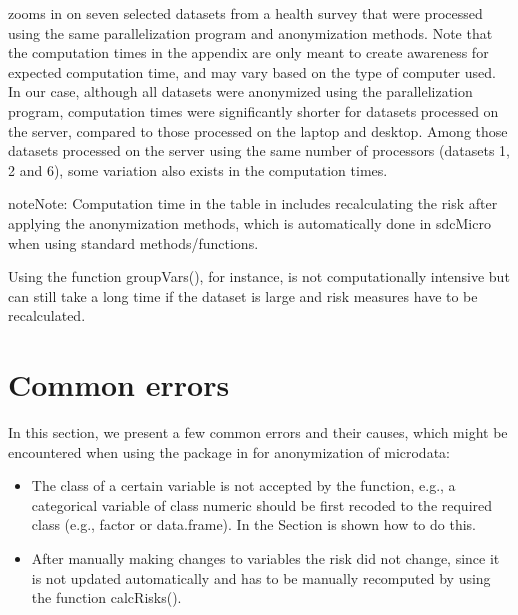\documentclass[letterpaper,10pt,english]{sphinxmanual}
\begin{document}
zooms in on seven selected datasets from a health survey that
were processed using the same parallelization program and anonymization
methods. Note that the computation times in the appendix are only meant
to create awareness for expected computation time, and may vary based on
the type of computer used. In our case, although all datasets were
anonymized using the parallelization program, computation times were
significantly shorter for datasets processed on the server, compared to
those processed on the laptop and desktop. Among those datasets
processed on the server using the same number of processors (datasets 1,
2 and 6), some variation also exists in the computation times.

\begin{sphinxadmonition}{note}{Note:}
Computation time in the table in
includes recalculating
the risk after applying the anonymization methods, which is
automatically done in sdcMicro when using standard methods/functions.
\end{sphinxadmonition}

Using the function groupVars(), for instance, is not computationally
intensive but can still take a long time if the dataset is large and
risk measures have to be recalculated.


\section{Common errors}
\label{\detokenize{sdcMicro:common-errors}}
In this section, we present a few common errors and their causes, which
might be encountered when using the  package in  for
anonymization of microdata:
\begin{itemize}
\item {} 
The class of a certain variable is not accepted by the function,
e.g., a categorical variable of class numeric should be first recoded
to the required class (e.g., factor or data.frame). In the Section
{\hyperref[\detokenize{sdcMicro:classes-in-r}]{}} is shown how to do this.

\item {} 
After manually making changes to variables the risk did not change,
since it is not updated automatically and has to be manually
recomputed by using the function calcRisks().

\end{itemize}
\end{document}
